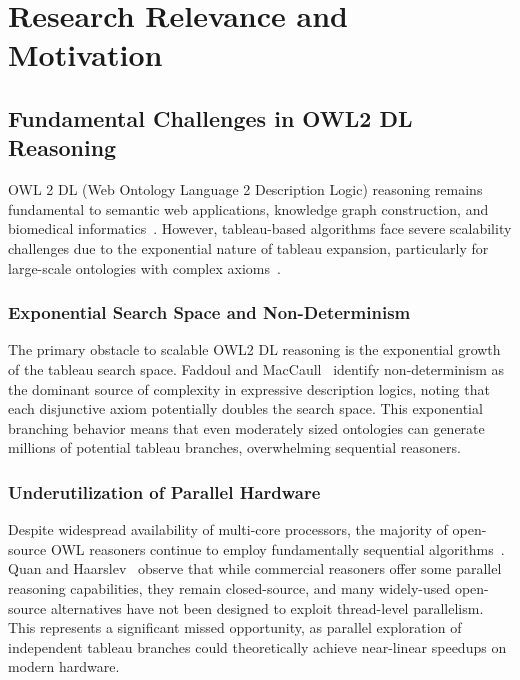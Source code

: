 
\section{Research Relevance and Motivation}

\subsection{Fundamental Challenges in OWL2 DL Reasoning}

OWL 2 DL (Web Ontology Language 2 Description Logic) reasoning remains fundamental to semantic web applications, knowledge graph construction, and biomedical informatics~\cite{hitzler2012owl}. However, tableau-based algorithms face severe scalability challenges due to the exponential nature of tableau expansion, particularly for large-scale ontologies with complex axioms~\cite{amir2017cedar}.

\subsubsection{Exponential Search Space and Non-Determinism}

The primary obstacle to scalable OWL2 DL reasoning is the exponential growth of the tableau search space. Faddoul and MacCaull~\cite{faddoul2015fork} identify non-determinism as the dominant source of complexity in expressive description logics, noting that each disjunctive axiom potentially doubles the search space. This exponential branching behavior means that even moderately sized ontologies can generate millions of potential tableau branches, overwhelming sequential reasoners.

\subsubsection{Underutilization of Parallel Hardware}

Despite widespread availability of multi-core processors, the majority of open-source OWL reasoners continue to employ fundamentally sequential algorithms~\cite{quan2017parallel}. Quan and Haarslev~\cite{quan2017parallel} observe that while commercial reasoners offer some parallel reasoning capabilities, they remain closed-source, and many widely-used open-source alternatives have not been designed to exploit thread-level parallelism. This represents a significant missed opportunity, as parallel exploration of independent tableau branches could theoretically achieve near-linear speedups on modern hardware.

